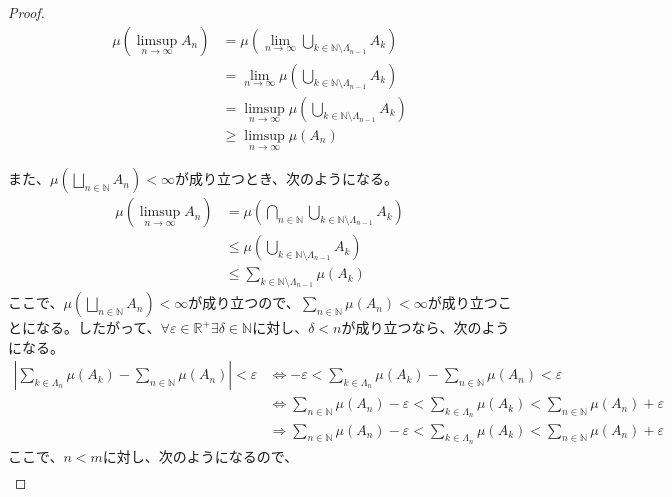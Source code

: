 \documentclass[dvipdfmx]{jsarticle}
\begin{document}
\begin{proof}
\begin{align*}
\mu\left( \limsup_{n \rightarrow \infty}A_{n} \right) &= \mu\left( \lim_{n \rightarrow \infty}{\bigcup_{k \in \mathbb{N} \setminus \varLambda_{n - 1}} A_{k}} \right)\\
&= \lim_{n \rightarrow \infty}{\mu\left( \bigcup_{k \in \mathbb{N} \setminus \varLambda_{n - 1}} A_{k} \right)}\\
&= \limsup_{n \rightarrow \infty}{\mu\left( \bigcup_{k \in \mathbb{N} \setminus \varLambda_{n - 1}} A_{k} \right)}\\
&\geq \limsup_{n \rightarrow \infty}{\mu\left( A_{n} \right)}
\end{align*}\par
また、$\mu\left( \bigsqcup_{n \in \mathbb{N}} A_{n} \right) < \infty$が成り立つとき、次のようになる。
\begin{align*}
\mu\left( \limsup_{n \rightarrow \infty}A_{n} \right) &= \mu\left( \bigcap_{n \in \mathbb{N}} {\bigcup_{k \in \mathbb{N} \setminus \varLambda_{n - 1}} A_{k}} \right)\\
&\leq \mu\left( \bigcup_{k \in \mathbb{N} \setminus \varLambda_{n - 1}} A_{k} \right)\\
&\leq \sum_{k \in \mathbb{N} \setminus \varLambda_{n - 1}} {\mu\left( A_{k} \right)}
\end{align*}
ここで、$\mu\left( \bigsqcup_{n \in \mathbb{N}} A_{n} \right) < \infty$が成り立つので、$\sum_{n \in \mathbb{N}} {\mu\left( A_{n} \right)} < \infty$が成り立つことになる。したがって、$\forall\varepsilon \in \mathbb{R}^{+}\exists\delta \in \mathbb{N}$に対し、$\delta < n$が成り立つなら、次のようになる。
\begin{align*}
\left| \sum_{k \in \varLambda_{n}} {\mu\left( A_{k} \right)} - \sum_{n \in \mathbb{N}} {\mu\left( A_{n} \right)} \right| < \varepsilon &\Leftrightarrow - \varepsilon < \sum_{k \in \varLambda_{n}} {\mu\left( A_{k} \right)} - \sum_{n \in \mathbb{N}} {\mu\left( A_{n} \right)} < \varepsilon\\
&\Leftrightarrow \sum_{n \in \mathbb{N}} {\mu\left( A_{n} \right)} - \varepsilon < \sum_{k \in \varLambda_{n}} {\mu\left( A_{k} \right)} < \sum_{n \in \mathbb{N}} {\mu\left( A_{n} \right)} + \varepsilon\\
&\Rightarrow \sum_{n \in \mathbb{N}} {\mu\left( A_{n} \right)} - \varepsilon < \sum_{k \in \varLambda_{n}} {\mu\left( A_{k} \right)} < \sum_{n \in \mathbb{N}} {\mu\left( A_{n} \right)} + \varepsilon
\end{align*}
ここで、$n < m$に対し、次のようになるので、
\begin{align*}

\end{align*}
\end{proof}
\end{document}
